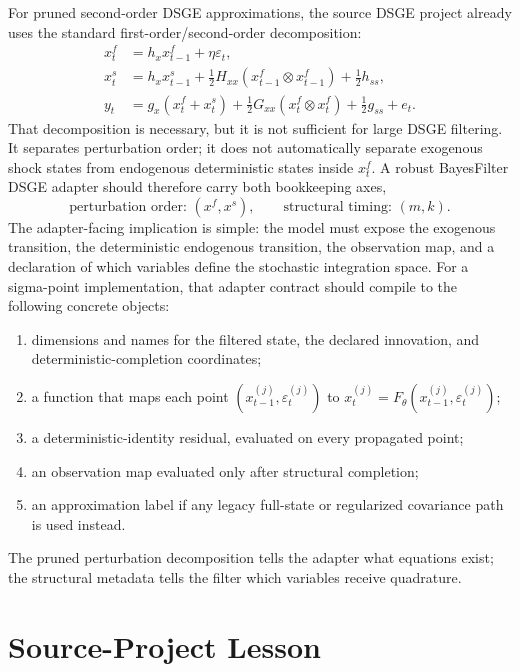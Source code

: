 For pruned second-order DSGE approximations, the source DSGE project already
uses the standard first-order/second-order decomposition:
\begin{align}
  x_t^f &= h_x x_{t-1}^f + \eta\varepsilon_t,\\
  x_t^s &= h_x x_{t-1}^s
    + \frac{1}{2}H_{xx}(x_{t-1}^f\otimes x_{t-1}^f)
    + \frac{1}{2}h_{ss},\\
  y_t &= g_x(x_t^f+x_t^s)
    + \frac{1}{2}G_{xx}(x_t^f\otimes x_t^f)
    + \frac{1}{2}g_{ss} + e_t .
\end{align}
That decomposition is necessary, but it is not sufficient for large DSGE
filtering.  It separates perturbation order; it does not automatically
separate exogenous shock states from endogenous deterministic states inside
$x_t^f$.  A robust BayesFilter DSGE adapter should therefore carry both
bookkeeping axes,
\begin{equation}
  \text{perturbation order: } (x^f,x^s),
  \qquad
  \text{structural timing: } (m,k).
\end{equation}
The adapter-facing implication is simple: the model must expose the exogenous
transition, the deterministic endogenous transition, the observation map, and a
declaration of which variables define the stochastic integration space.
For a sigma-point implementation, that adapter contract should compile to the
following concrete objects:
\begin{enumerate}[label=(\roman*)]
  \item dimensions and names for the filtered state, the declared innovation,
    and deterministic-completion coordinates;
  \item a function that maps each point
    $(x_{t-1}^{(j)},\varepsilon_t^{(j)})$ to
    $x_t^{(j)}=F_\theta(x_{t-1}^{(j)},\varepsilon_t^{(j)})$;
  \item a deterministic-identity residual, evaluated on every propagated point;
  \item an observation map evaluated only after structural completion;
  \item an approximation label if any legacy full-state or regularized
    covariance path is used instead.
\end{enumerate}
The pruned perturbation decomposition tells the adapter what equations exist;
the structural metadata tells the filter which variables receive quadrature.

\section{Source-Project Lesson}
\label{sec:bf-current-source-project-failure-mode}

